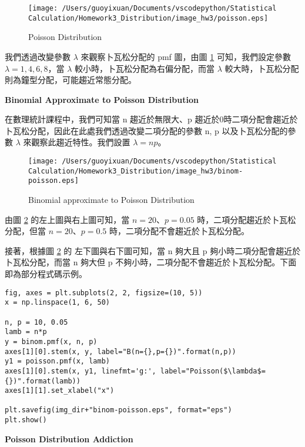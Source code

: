 \begin{figure}[H]
    \centering
        \texttt{[image: /Users/guoyixuan/Documents/vscodepython/Statistical Calculation/Homework3\_Distribution/image\_hw3/poisson.eps]}
    \caption{Poisson Distribution}
    \label{fig:Poisson Distribution}
\end{figure}

我們透過改變參數 $\lambda$ 來觀察卜瓦松分配的 pmf 圖，由圖 \ref{fig:Poisson Distribution} 可知，我們設定參數 $\lambda=1, 4, 6, 8$，當 $\lambda$ 較小時，卜瓦松分配為右偏分配，而當 $\lambda$ 較大時，卜瓦松分配則為鐘型分配，可能趨近常態分配。

\textbf{Binomial Approximate to Poisson Distribution}

在數理統計課程中，我們可知當 n 趨近於無限大、p 趨近於0時二項分配會趨近於卜瓦松分配，因此在此處我們透過改變二項分配的參數 n, p 以及卜瓦松分配的參數 $\lambda$ 來觀察此趨近特性。我們設置 $\lambda=np$。

\begin{figure}[H]
    \centering
        \texttt{[image: /Users/guoyixuan/Documents/vscodepython/Statistical Calculation/Homework3\_Distribution/image\_hw3/binom-poisson.eps]}
    \caption{Binomial approximate to Poisson Distribution}
    \label{fig:Binomial approximate to Poisson Distribution}
\end{figure}

由圖 \ref{fig:Binomial approximate to Poisson Distribution} 的左上圖與右上圖可知，當 $n=20$、$p=0.05$ 時，二項分配趨近於卜瓦松分配，但當 $n=20$、$p=0.5$ 時，二項分配不會趨近於卜瓦松分配。

接著，根據圖 \ref{fig:Binomial approximate to Poisson Distribution} 的 左下圖與右下圖可知，當 n 夠大且 p 夠小時二項分配會趨近於卜瓦松分配，而當 n 夠大但 p 不夠小時，二項分配不會趨近於卜瓦松分配。下面即為部分程式碼示例。

\bigskip
\begin{lstlisting}
fig, axes = plt.subplots(2, 2, figsize=(10, 5))
x = np.linspace(1, 6, 50)

n, p = 10, 0.05
lamb = n*p
y = binom.pmf(x, n, p)
axes[1][0].stem(x, y, label="B(n={},p={})".format(n,p))
y1 = poisson.pmf(x, lamb)
axes[1][0].stem(x, y1, linefmt='g:', label="Poisson($\lambda$={})".format(lamb))
axes[1][1].set_xlabel("x")

plt.savefig(img_dir+"binom-poisson.eps", format="eps")
plt.show()
\end{lstlisting}

\textbf{Poisson Distribution Addiction}


